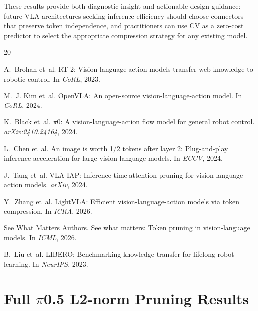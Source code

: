 \documentclass[10pt,twocolumn]{article}
\begin{document}
These results provide both diagnostic insight and actionable design guidance: future VLA architectures seeking inference efficiency should choose connectors that preserve token independence, and practitioners can use CV as a zero-cost predictor to select the appropriate compression strategy for any existing model.

\begin{thebibliography}{20}

A.~Brohan et~al.
\newblock RT-2: Vision-language-action models transfer web knowledge to robotic control.
\newblock In \emph{CoRL}, 2023.

M.~J. Kim et~al.
\newblock OpenVLA: An open-source vision-language-action model.
\newblock In \emph{CoRL}, 2024.

K.~Black et~al.
\newblock $\pi$0: A vision-language-action flow model for general robot control.
\newblock \emph{arXiv:2410.24164}, 2024.

L.~Chen et~al.
\newblock An image is worth 1/2 tokens after layer 2: Plug-and-play inference acceleration for large vision-language models.
\newblock In \emph{ECCV}, 2024.

J.~Tang et~al.
\newblock VLA-IAP: Inference-time attention pruning for vision-language-action models.
\newblock \emph{arXiv}, 2024.

Y.~Zhang et~al.
\newblock LightVLA: Efficient vision-language-action models via token compression.
\newblock In \emph{ICRA}, 2026.

{See What Matters Authors}.
\newblock See what matters: Token pruning in vision-language models.
\newblock In \emph{ICML}, 2026.

B.~Liu et~al.
\newblock LIBERO: Benchmarking knowledge transfer for lifelong robot learning.
\newblock In \emph{NeurIPS}, 2023.

\end{thebibliography}

\appendix

\section{Full $\pi$0.5 L2-norm Pruning Results}
\label{app:pi05_l2norm}
\end{document}
